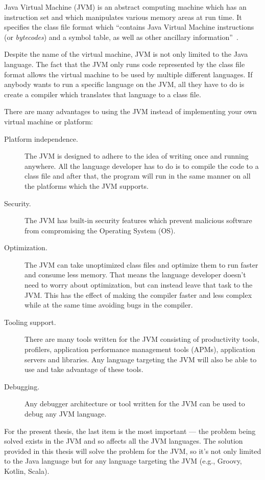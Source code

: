 \documentclass[..thesis.tex]{subfiles}
\begin{document}
Java Virtual Machine (JVM) is an abstract computing machine which has an instruction set and which manipulates various memory areas at run time. %
It specifies the class file format which \enquote{contains Java Virtual Machine instructions (or \textit{bytecodes}) and a symbol table, as well as other ancillary information}~\cite{oracle_jvm_spec}.

Despite the name of the virtual machine, JVM is not only limited to the Java language. 
The fact that the JVM only runs code represented by the class file format allows the virtual machine to be used by multiple different languages.
If anybody wants to run a specific language on the JVM, all they have to do is create a compiler which translates that language to a class file.

There are many advantages to using the JVM instead of implementing your own virtual machine or platform:

\begin{description}
  \item[Platform independence.]
    The JVM is designed to adhere to the idea of writing once and running anywhere. 
    All the language developer has to do is to compile the code to a class file and after that, the program will run in the same manner on all the platforms which the JVM supports.
  \item[Security.] 
    The JVM has built-in security features which prevent malicious software from compromising the Operating System (OS). 
  \item[Optimization.] 
    The JVM can take unoptimized class files and optimize them to run faster and consume less memory. 
    That means the language developer doesn't need to worry about optimization, but can instead leave that task to the JVM.
    This has the effect of making the compiler faster and less complex while at the same time avoiding bugs in the compiler.
  \item[Tooling support.]
    There are many tools written for the JVM consisting of productivity tools, profilers, application performance management tools (APMs), application servers and libraries. 
    Any language targeting the JVM will also be able to use and take advantage of these tools.
  \item[Debugging.]
    Any debugger architecture or tool written for the JVM can be used to debug any JVM language.
\end{description}

For the present thesis, the last item is the most important --- the problem being solved exists in the JVM and so affects all the JVM languages. 
The solution provided in this thesis will solve the problem for the JVM, so it's not only limited to the Java language but for any language targeting the JVM (e.g., Groovy, Kotlin, Scala).
\end{document}
